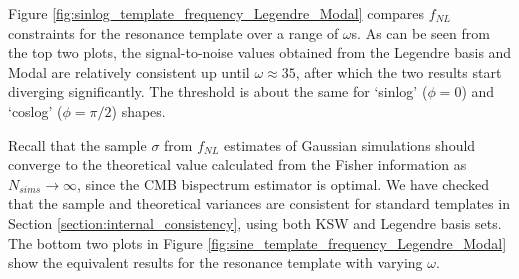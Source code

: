 \documentclass[a4paper,12pt,times,custombib,print,index]{Classes/PhDThesisPSnPDF} %
\providecommand{\DIFadd}[1]{{\protect\color{blue}\uwave{#1}}} %
\providecommand{\DIFdel}[1]{{\protect\color{red}\sout{#1}}}                      %
\providecommand{\DIFaddbegin}{} %
\providecommand{\DIFaddend}{} %
\providecommand{\DIFdelbegin}{} %
\providecommand{\DIFdelend}{} %
\newcommand{\DIFscaledelfig}{0.5}
\newlength{\DIFdelgraphicswidth} %
\newlength{\DIFdelgraphicsheight} %
\newcommand{\DIFaddincludegraphics}[2][]{{\color{blue}\fbox{\DIFOincludegraphics[#1]{#2}}}} %
\newcommand{\DIFdelincludegraphics}[2][]{%
\sbox{\DIFdelgraphicsbox}{\DIFOincludegraphics[#1]{#2}}%
\settoboxwidth{\DIFdelgraphicswidth}{\DIFdelgraphicsbox} %
\settoboxtotalheight{\DIFdelgraphicsheight}{\DIFdelgraphicsbox} %
\scalebox{\DIFscaledelfig}{%
\parbox[b]{\DIFdelgraphicswidth}{\usebox{\DIFdelgraphicsbox}\\[-\baselineskip] \rule{\DIFdelgraphicswidth}{0em}}\llap{\resizebox{\DIFdelgraphicswidth}{\DIFdelgraphicsheight}{%
\setlength{\unitlength}{\DIFdelgraphicswidth}%
\begin{picture}(1,1)%
\thicklines\linethickness{2pt} %
{\color[rgb]{1,0,0}\put(0,0){\framebox(1,1){}}}%
{\color[rgb]{1,0,0}\put(0,0){\line( 1,1){1}}}%
{\color[rgb]{1,0,0}\put(0,1){\line(1,-1){1}}}%
\end{picture}%
}\hspace*{3pt}}} %
} %
\DeclareRobustCommand{\DIFaddbegin}{\DIFOaddbegin \let\includegraphics\DIFaddincludegraphics} %
\DeclareRobustCommand{\DIFaddend}{\DIFOaddend \let\includegraphics\DIFOincludegraphics} %
\DeclareRobustCommand{\DIFdelbegin}{\DIFOdelbegin \let\includegraphics\DIFdelincludegraphics} %
\DeclareRobustCommand{\DIFdelend}{\DIFOaddend \let\includegraphics\DIFOincludegraphics} %
\begin{document}
Figure \ref{fig:sinlog_template_frequency_Legendre_Modal} compares \DIFdelbegin \DIFdel{$f_{NL}$ }\DIFdelend \DIFaddbegin \DIFadd{$f_\text{NL}$ }\DIFaddend constraints for the resonance template over a range of $\omega$s. As can be seen from the top two plots, the signal-to-noise values obtained from the Legendre basis and Modal are relatively consistent up until $\omega \approx 35$, after which the two results start diverging significantly. The threshold is about the same for `sinlog' ($\phi = 0$) and `coslog' ($\phi=\pi/2$) shapes.

Recall that the sample $\sigma$ from \DIFdelbegin \DIFdel{$f_{NL}$ }\DIFdelend \DIFaddbegin \DIFadd{$f_\text{NL}$ }\DIFaddend estimates of Gaussian simulations should converge to the theoretical value calculated from the Fisher information as \DIFdelbegin \DIFdel{$N_{sims}\rightarrow\infty$}\DIFdelend \DIFaddbegin \DIFadd{$N_\text{sims}\rightarrow\infty$}\DIFaddend , since the CMB bispectrum estimator is optimal. We have checked that the sample and theoretical variances are consistent for standard templates in Section \ref{section:internal_consistency}, using both KSW and Legendre basis sets. The bottom two plots in Figure \ref{fig:sine_template_frequency_Legendre_Modal} show the equivalent results for the resonance template with varying $\omega$.
\end{document}
